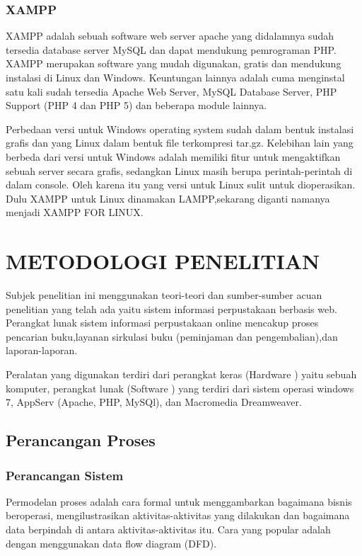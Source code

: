 \documentclass{jtetiproposalskripsi}
\begin{document}
\subsection{XAMPP}
XAMPP adalah sebuah software web server apache yang didalamnya sudah tersedia database server MySQL dan dapat mendukung pemrograman PHP. XAMPP merupakan software yang mudah digunakan, gratis dan mendukung instalasi di Linux dan Windows. Keuntungan lainnya adalah cuma menginstal satu kali sudah tersedia Apache Web Server, MySQL Database Server, PHP Support (PHP 4 dan PHP 5) dan beberapa module lainnya.

Perbedaan versi untuk Windows operating system sudah dalam bentuk instalasi grafis dan yang Linux dalam bentuk file terkompresi tar.gz. Kelebihan lain yang berbeda dari versi untuk Windows adalah memiliki fitur untuk mengaktifkan sebuah server secara grafis, sedangkan Linux masih berupa perintah-perintah di dalam console. Oleh karena itu yang versi untuk Linux sulit untuk dioperasikan. Dulu XAMPP untuk Linux dinamakan LAMPP,sekarang diganti namanya menjadi XAMPP FOR LINUX. 


\chapter{METODOLOGI PENELITIAN}
Subjek penelitian ini menggunakan teori-teori dan sumber-sumber acuan penelitian yang telah ada yaitu sistem informasi perpustakaan berbasis web.
Perangkat lunak sistem informasi perpustakaan online  mencakup proses pencarian buku,layanan sirkulasi buku (peminjaman dan pengembalian),dan laporan-laporan. 

Peralatan yang digunakan terdiri dari perangkat keras (Hardware ) yaitu sebuah komputer, perangkat lunak (Software ) yang terdiri dari sistem operasi 
windows  7, AppServ (Apache, PHP, MySQl), dan Macromedia Dreamweaver.

\section{Perancangan Proses}
\subsection{Perancangan Sistem}
Permodelan proses adalah cara formal untuk menggambarkan bagaimana bisnis beroperasi, mengilustrasikan aktivitas-aktivitas yang dilakukan dan bagaimana data berpindah di antara aktivitas-aktivitas itu. Cara yang popular adalah dengan menggunakan data flow diagram (DFD). 
\end{document}

